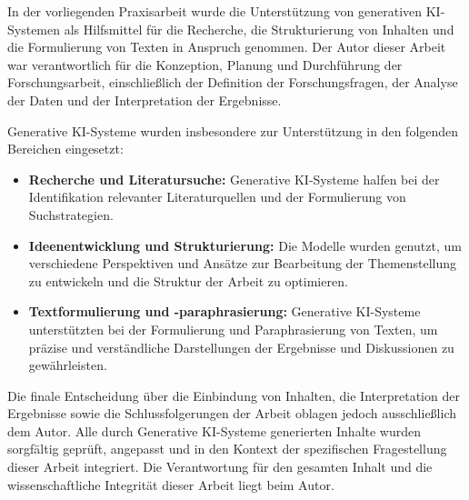 In der vorliegenden Praxisarbeit wurde die Unterstützung von generativen KI-Systemen
als Hilfsmittel für die Recherche, die Strukturierung von Inhalten und die Formulierung
von Texten in Anspruch genommen. Der Autor dieser Arbeit war verantwortlich für die
Konzeption, Planung und Durchführung der Forschungsarbeit, einschließlich der Definition
der Forschungsfragen, der Analyse der Daten und der Interpretation der Ergebnisse.

Generative KI-Systeme wurden insbesondere zur Unterstützung in den folgenden Bereichen
eingesetzt:
\begin{itemize}
    \item \textbf{Recherche und Literatursuche:} Generative KI-Systeme halfen bei der Identifikation relevanter Literaturquellen und der Formulierung von Suchstrategien.
    \item \textbf{Ideenentwicklung und Strukturierung:} Die Modelle wurden genutzt, um verschiedene Perspektiven und Ansätze zur Bearbeitung der Themenstellung zu entwickeln und die Struktur der Arbeit zu optimieren.
    \item \textbf{Textformulierung und -paraphrasierung:} Generative KI-Systeme unterstützten bei der Formulierung und Paraphrasierung von Texten, um präzise und verständliche Darstellungen der Ergebnisse und Diskussionen zu gewährleisten.
\end{itemize}

Die finale Entscheidung über die Einbindung von Inhalten, die Interpretation der Ergebnisse
sowie die Schlussfolgerungen der Arbeit oblagen jedoch ausschließlich dem Autor.
Alle durch Generative KI-Systeme generierten Inhalte wurden sorgfältig geprüft, angepasst
und in den Kontext der spezifischen Fragestellung dieser Arbeit integriert. Die Verantwortung
für den gesamten Inhalt und die wissenschaftliche Integrität dieser Arbeit
liegt beim Autor.